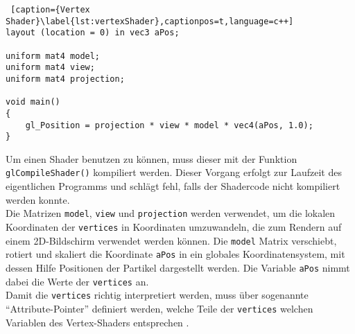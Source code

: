 \documentclass[11pt,a4paper]{article}
\begin{document}
\begin{lstlisting} [caption={Vertex Shader}\label{lst:vertexShader},captionpos=t,language=c++]
layout (location = 0) in vec3 aPos;

uniform mat4 model;
uniform mat4 view;
uniform mat4 projection;

void main()
{
	gl_Position = projection * view * model * vec4(aPos, 1.0);
}
\end{lstlisting}
\noindent
Um einen Shader benutzen zu können, muss dieser mit der Funktion \lstinline!glCompileShader()! kompiliert werden. Dieser Vorgang erfolgt zur Laufzeit des eigentlichen Programms und schlägt fehl, falls der Shadercode nicht kompiliert werden konnte.\\
Die Matrizen \lstinline!model!, \lstinline!view! und \lstinline!projection! werden verwendet, um die lokalen Koordinaten der \lstinline!vertices! in Koordinaten umzuwandeln, die zum Rendern auf einem 2D-Bildschirm verwendet werden können. Die \lstinline!model! Matrix verschiebt, rotiert und skaliert die Koordinate \lstinline!aPos! in ein globales Koordinatensystem, mit dessen Hilfe Positionen der Partikel dargestellt werden. Die Variable \lstinline!aPos! nimmt dabei die Werte der \lstinline!vertices! an.\\
Damit die \lstinline!vertices! richtig interpretiert werden, muss über sogenannte ``Attribute-Pointer'' definiert werden, welche Teile der \lstinline!vertices! welchen Variablen des Vertex-Shaders entsprechen \cite[Hello-Triangle]{LearnOpenGL}.
\end{document}

